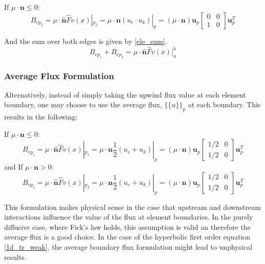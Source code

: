 If $\mu \cdot \mathbf n \leq 0$:
\begin{equation}
B_{ep_2} = \mu \cdot \hat{\mathbf n} \hat{F}  v(x)|_{p_2} = 
\mu \cdot \mathbf n (u_e \cdot u_k)|_p = 
(\mu \cdot \mathbf n) \mathbf u_p 
\begin{bmatrix}
    0      & 0 \\
    1      & 0 
\end{bmatrix}
\mathbf u_p^T
\end{equation}

And the sum over both edges is given by \ref{ele_sum}.
\begin{equation}
 B_{ep_1} + B_{ep_2} = \mu \cdot \hat{\mathbf n} \hat{F}  v(x)|_a^b
\label{ele_sum}
\end{equation}

\subsubsection{Average Flux Formulation}
Alternatively, instead of simply taking the upwind flux value at each element boundary, one may choose to use the average flux, $\{\{u\}\}_p$ at each boundary.  This results in the following:

If $\mu \cdot \mathbf n \leq 0$: 
\begin{equation}
B_{ep_1} = \mu \cdot \hat{\mathbf n} \hat{F}  v(x)|_{p_1} = 
\mu \cdot \mathbf n \frac{1}{2} (u_e + u_k)|_p = 
(\mu \cdot \mathbf n) \mathbf u_p 
\begin{bmatrix}
    1/2     & 0 \\
    1/2     & 0 
\end{bmatrix}
\mathbf u_p^T
\end{equation}
and
If $\mu \cdot \mathbf n > 0$:
\begin{equation}
B_{ep_2} = \mu \cdot \hat{\mathbf n} \hat{F}  v(x)|_{p_2} = 
\mu \cdot \mathbf n  \frac{1}{2} (u_e + u_k)|_p = 
(\mu \cdot \mathbf n) \mathbf u_p 
\begin{bmatrix}
    1/2     & 0 \\
    1/2     & 0 
\end{bmatrix}
\mathbf u_p^T
\end{equation}

This formulation makes physical sense in the case that upstream and downstream interactions influence the value of the flux at element boundaries.  In the purely diffusive case, where Fick's law holds, this assumption is valid an therefore the average flux is a good choice.  In the case of the hyperbolic first order equation \ref{1d_tr_weak}, the average boundary flux formulation might lead to unphysical results.

